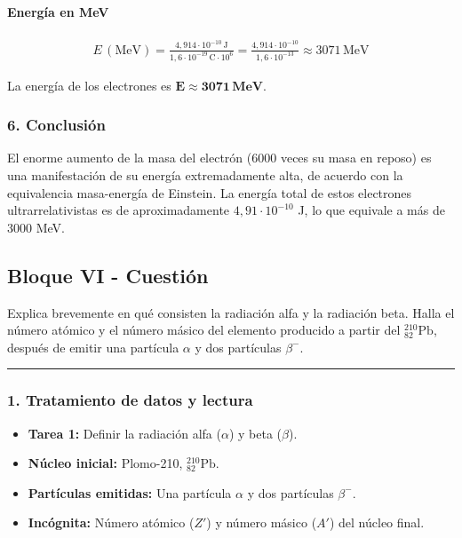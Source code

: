 \paragraph{Energía en MeV}
\begin{gather}
    E\,(\text{MeV}) = \frac{4,914 \cdot 10^{-10}\,\text{J}}{1,6 \cdot 10^{-19}\,\text{C} \cdot 10^6} = \frac{4,914 \cdot 10^{-10}}{1,6 \cdot 10^{-13}} \approx 3071\,\text{MeV}
\end{gather}
\begin{cajaresultado}
La energía de los electrones es $\boldsymbol{E \approx 3071\,\textbf{MeV}}$.
\end{cajaresultado}

\subsubsection*{6. Conclusión}
\begin{cajaconclusion}
El enorme aumento de la masa del electrón (6000 veces su masa en reposo) es una manifestación de su energía extremadamente alta, de acuerdo con la equivalencia masa-energía de Einstein. La energía total de estos electrones ultrarrelativistas es de aproximadamente $4,91 \cdot 10^{-10}$ J, lo que equivale a más de 3000 MeV.
\end{cajaconclusion}

\newpage

\subsection{Bloque VI - Cuestión}
\label{subsec:A6_2013_jul_ext}

\begin{cajaenunciado}
Explica brevemente en qué consisten la radiación alfa y la radiación beta. Halla el número atómico y el número másico del elemento producido a partir del ${}_{82}^{210}\text{Pb}$, después de emitir una partícula $\alpha$ y dos partículas $\beta^{-}$.
\end{cajaenunciado}
\hrule

\subsubsection*{1. Tratamiento de datos y lectura}
\begin{itemize}
    \item \textbf{Tarea 1:} Definir la radiación alfa ($\alpha$) y beta ($\beta$).
    \item \textbf{Núcleo inicial:} Plomo-210, ${}_{82}^{210}\text{Pb}$.
    \item \textbf{Partículas emitidas:} Una partícula $\alpha$ y dos partículas $\beta^{-}$.
    \item \textbf{Incógnita:} Número atómico ($Z'$) y número másico ($A'$) del núcleo final.
\end{itemize}

